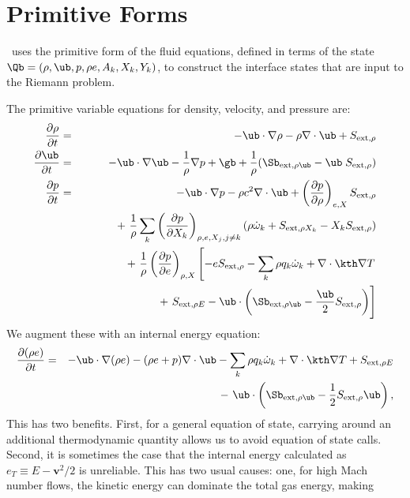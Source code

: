 \section{Primitive Forms}
\castro\ uses the primitive form of the fluid equations, defined in terms of
the state $\Qb = (\rho, \ub, p, \rho e, A_k, X_k, Y_k)$, to construct the
interface states that are input to the Riemann problem.

The primitive variable equations for density, velocity, and pressure are:
\begin{eqnarray}
  \frac{\partial\rho}{\partial t} &=& -\ub\cdot\nabla\rho - \rho\nabla\cdot\ub + S_{{\rm ext},\rho} \\
%
  \frac{\partial\ub}{\partial t} &=& -\ub\cdot\nabla\ub - \frac{1}{\rho}\nabla p + \gb + 
\frac{1}{\rho} (\Sb_{{\rm ext},\rho\ub} - \ub \; S_{{\rm ext},\rho}) \\
\frac{\partial p}{\partial t} &=& -\ub\cdot\nabla p - \rho c^2\nabla\cdot\ub +
\left(\frac{\partial p}{\partial \rho}\right)_{e,X}S_{{\rm ext},\rho}\nonumber\\
&&+\  \frac{1}{\rho}\sum_k\left(\frac{\partial p}{\partial X_k}\right)_{\rho,e,X_j,j\neq k}\left(\rho\dot\omega_k + S_{{\rm ext},\rho X_k} - X_kS_{{\rm ext},\rho}\right)\nonumber\\
&& +\  \frac{1}{\rho}\left(\frac{\partial p}{\partial e}\right)_{\rho,X}\left[-eS_{{\rm ext},\rho} - \sum_k\rho q_k\dot\omega_k + \nabla\cdot\kth\nabla T \right.\nonumber\\
&& \quad\qquad\qquad\qquad+\ S_{{\rm ext},\rho E} - \ub\cdot\left(\Sb_{{\rm ext},\rho\ub} - \frac{\ub}{2}S_{{\rm ext},\rho}\right)\Biggr] 
\end{eqnarray}
We augment these with an internal energy equation:
\begin{eqnarray}
\frac{\partial(\rho e)}{\partial t} &=& - \ub\cdot\nabla(\rho e) - (\rho e+p)\nabla\cdot\ub - \sum_k \rho q_k\dot\omega_k 
                                        + \nabla\cdot\kth\nabla T + S_{{\rm ext},\rho E} \nonumber\\
&& -\  \ub\cdot\left(\Sb_{{\rm ext},\rho\ub}-\frac{1}{2}S_{{\rm ext},\rho}\ub\right), 
\end{eqnarray}
This has two benefits. First, for a general equation of state,
carrying around an additional thermodynamic quantity allows us to
avoid equation of state calls. Second, it is sometimes the case that
the internal energy calculated as $e_T \equiv E - \mathbf{v}^2 / 2$ is
unreliable.  This has two usual causes: one, for high Mach number
flows, the kinetic energy can dominate the total gas energy, making
